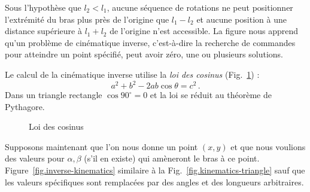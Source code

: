Sous l'hypothèse que $l_2<l_1$, aucune séquence de rotations ne peut positionner l'extrémité du bras plus près de l'origine que $l_1-l_2$ et aucune position à une distance supérieure à $l_1+l_2$ de l'origine n'est accessible. La figure nous apprend qu'un problème de cinématique inverse, c'est-à-dire la recherche de commandes pour atteindre un point spécifié, peut avoir zéro, une ou plusieurs solutions.

Le calcul de la cinématique inverse utilise la \emph{loi des cosinus} (Fig.~\ref{fig.cosines}) :
\[
a^2 + b^2 - 2ab \cos \theta = c^2\,.
\]
Dans un triangle rectangle $\cos 90^{\circ} = 0$ et la loi se réduit au théorème de Pythagore.

\begin{figure}
\begin{center}
\end{center}
\caption{Loi des cosinus}\label{fig.cosines}
\end{figure}

Supposons maintenant que l'on nous donne un point $(x,y)$ et que nous voulions des valeurs pour $\alpha,\beta$ (s'il en existe) qui amèneront le bras à ce point. Figure~\ref{fig.inverse-kinematics} similaire à la Fig.~\ref{fig.kinematics-triangle} sauf que les valeurs spécifiques sont remplacées par des angles et des longueurs arbitraires.


